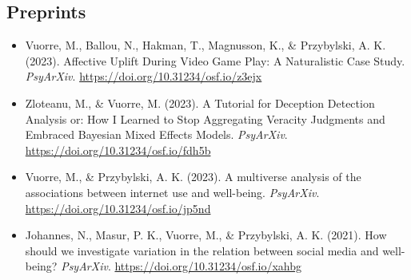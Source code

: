 \documentclass[12pt, a4paper]{article}
\begin{document}
\subsection*{Preprints}
\begin{itemize}
  \item Vuorre, M., Ballou, N., Hakman, T., Magnusson, K., \& Przybylski, A. K. (2023). Affective Uplift During Video Game Play: A Naturalistic Case Study. \emph{PsyArXiv}. \url{https://doi.org/10.31234/osf.io/z3ejx}
  \item Zloteanu, M., \& Vuorre, M. (2023). A Tutorial for Deception Detection Analysis or: How I Learned to Stop Aggregating Veracity Judgments and Embraced Bayesian Mixed Effects Models. \emph{PsyArXiv}. \url{https://doi.org/10.31234/osf.io/fdh5b}
  \item Vuorre, M., \& Przybylski, A. K. (2023). A multiverse analysis of the associations between internet use and well-being. \emph{PsyArXiv}. \url{https://doi.org/10.31234/osf.io/jp5nd}
  \item Johannes, N., Masur, P. K., Vuorre, M., \& Przybylski, A. K. (2021). How should we investigate variation in the relation between social media and well-being? \emph{PsyArXiv}. \url{https://doi.org/10.31234/osf.io/xahbg}
\end{itemize}
\end{document}
